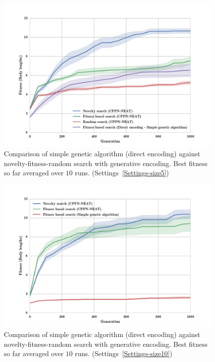 \begin{figure}[t!]
\centering
\includegraphics[width=1.0\textwidth]{../Figures/Results/FitNovRandomDirectSize5.pdf}
\caption{Comparison of simple genetic algorithm (direct encoding) against novelty-fitness-random search with generative encoding. Best fitness so far averaged over $10$ runs. (Settings~\ref{Settings-size5})}
\label{fig:FitNovRandomDirectSize5}
\end{figure}

\begin{figure}[t!]
\centering
\includegraphics[width=1.0\textwidth]{../Figures/Results/FitvsNovVsDirSize10.pdf}
\caption{Comparison of simple genetic algorithm (direct encoding) against novelty-fitness-random search with generative encoding. Best fitness so far averaged over $10$ runs. (Settings~\ref{Settings-size10})}
\label{fig:FitvsNovVsDirSize10}
\end{figure}

